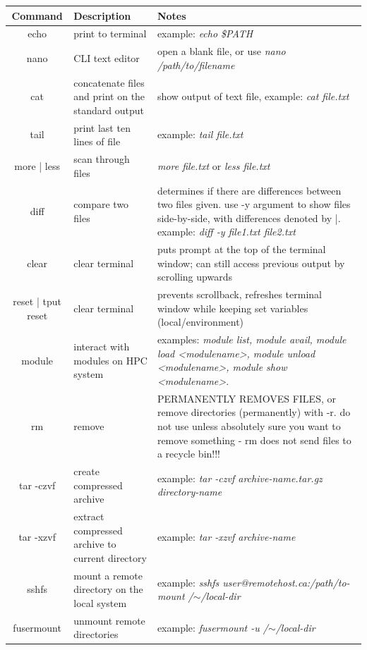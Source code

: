 \documentclass[12pt]{article}
\begin{document}
\begin{table}[H]
\begin{changemargin}{-1.5cm}{-1.5cm}
\centering
{\renewcommand{\arraystretch}{1.4}%
\begin{tabular}{|c|C{4.5cm}|C{9.5cm}|}
\hline
\textbf{Command} & \textbf{Description} & \textbf{Notes} \\
\hline
echo & print to terminal & example: \textit{echo \$PATH}\\
nano & CLI text editor & open a blank file, or use \textit{nano /path/to/filename} \\
cat & concatenate files and print on the standard output & show output of text file, example: \textit{cat file.txt} \\
tail & print last ten lines of file & example: \textit{tail file.txt} \\
more | less & scan through files & \textit{more file.txt} or \textit{less file.txt} \\ 
diff & compare two files & determines if there are differences between two files given. use -y argument to show files side-by-side, with differences denoted by |. example: \textit{diff -y file1.txt file2.txt} \\
clear & clear terminal & puts prompt at the top of the terminal window; can still access previous output by scrolling upwards \\
reset | tput reset & clear terminal & prevents scrollback, refreshes terminal window while keeping set variables (local/environment) \\
module & interact with modules on HPC system & examples: \textit{module list, module avail, module load <modulename>, module unload <modulename>, module show <modulename>}. \\
rm & remove & PERMANENTLY REMOVES FILES, or remove directories (permanently) with -r. do not use unless absolutely sure you want to remove something - rm does not send files to a recycle bin!!! \\
tar -czvf & create compressed archive & example: \textit{tar -czvf archive-name.tar.gz directory-name} \\
tar -xzvf & extract compressed archive to current directory & example: \textit{tar -xzvf archive-name} \\
sshfs & mount a remote directory on the local system & example: \textit{sshfs user@remotehost.ca:/path/to-mount /$\sim$/local-dir} \\
fusermount & unmount remote directories & example: \textit{fusermount -u /$\sim$/local-dir} \\

\hline
\end{tabular}
}
\end{changemargin}
\end{table}
\newpage
\end{document}

